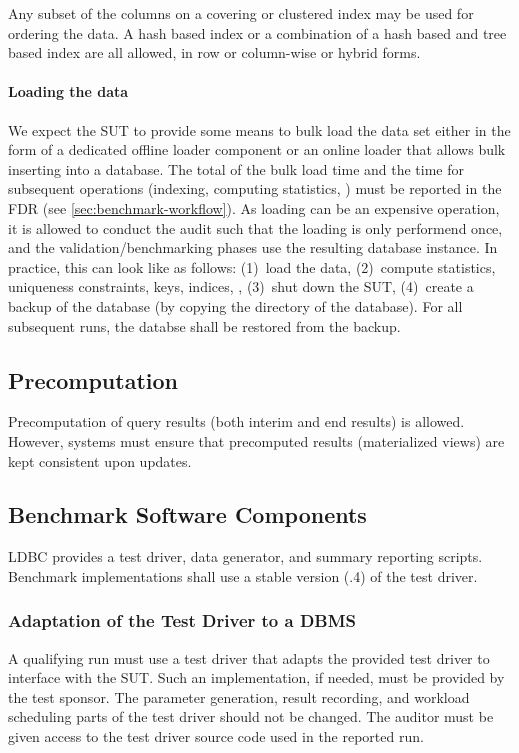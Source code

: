 Any subset of the columns on a covering or clustered index may be used for ordering the data. A hash based index or a combination of a hash based and tree based index are all allowed, in row or column-wise or hybrid forms.

\paragraph{Loading the data}

We expect the SUT to provide some means to bulk load the data set either in the form of a dedicated offline loader component or an online loader that allows bulk inserting into a database.
The total of the bulk load time and the time for subsequent operations (indexing, computing statistics, \etc) must be reported in the FDR (see \autoref{sec:benchmark-workflow}).
As loading can be an expensive operation, it is allowed to conduct the audit such that the loading is only performend once, and the validation/benchmarking phases use the resulting database instance.
In practice, this can look like as follows:
(1)~load the data,
(2)~compute statistics, uniqueness constraints, keys, indices, \etc,
(3)~shut down the SUT,
(4)~create a backup of the database (\eg by copying the directory of the database).
For all subsequent runs, the databse shall be restored from the backup.

\subsection{Precomputation}

Precomputation of query results (both interim and end results) is allowed. However, systems must ensure that precomputed results (\eg materialized views) are kept consistent upon updates.

\subsection{Benchmark Software Components}
\label{sec:snb-software-components}
LDBC provides a test driver, data generator, and summary reporting scripts. Benchmark implementations shall use a stable version (.4) of the test driver.

\subsubsection{Adaptation of the Test Driver to a DBMS}
\label{sec:test-driver}
A qualifying run must use a test driver that adapts the provided test driver to interface with the SUT. Such an implementation, if needed, must be provided by the test sponsor. The parameter generation, result recording, and workload scheduling parts of the test driver should not be changed. The auditor must be given access to the test driver source code used in the reported run.

